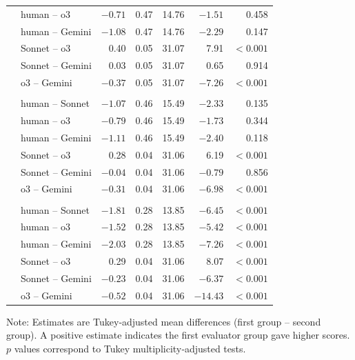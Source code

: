 \documentclass{wiley-article}
\begin{document}
\begin{table}[H]
\begin{threeparttable}
\begin{tabular}{l p{} r r r r r}
        & human – o3       & $-0.71$ & 0.47 & 14.76 & $-1.51$ & 0.458 \\
        & human – Gemini   & $-1.08$ & 0.47 & 14.76 & $-2.29$ & 0.147 \\
        & Sonnet – o3      &  0.40   & 0.05 & 31.07 &  7.91   & $<\!0.001$ \\
        & Sonnet – Gemini  &  0.03   & 0.05 & 31.07 &  0.65   & 0.914 \\
        & o3 – Gemini      & $-0.37$ & 0.05 & 31.07 & $-7.26$ & $<\!0.001$ \\
      \addlinespace
      \multicolumn{7}{l}{\textbf{EMP}}\\
        & human – Sonnet   & $-1.07$ & 0.46 & 15.49 & $-2.33$ & 0.135 \\
        & human – o3       & $-0.79$ & 0.46 & 15.49 & $-1.73$ & 0.344 \\
        & human – Gemini   & $-1.11$ & 0.46 & 15.49 & $-2.40$ & 0.118 \\
        & Sonnet – o3      &  0.28   & 0.04 & 31.06 &  6.19   & $<\!0.001$ \\
        & Sonnet – Gemini  & $-0.04$ & 0.04 & 31.06 & $-0.79$ & 0.856 \\
        & o3 – Gemini      & $-0.31$ & 0.04 & 31.06 & $-6.98$ & $<\!0.001$ \\
      \addlinespace
      \multicolumn{7}{l}{\textbf{OVR}}\\
        & human – Sonnet   & $-1.81$ & 0.28 & 13.85 & $-6.45$ & $<\!0.001$ \\
        & human – o3       & $-1.52$ & 0.28 & 13.85 & $-5.42$ & $<\!0.001$ \\
        & human – Gemini   & $-2.03$ & 0.28 & 13.85 & $-7.26$ & $<\!0.001$ \\
        & Sonnet – o3      &  0.29   & 0.04 & 31.06 &  8.07   & $<\!0.001$ \\
        & Sonnet – Gemini  & $-0.23$ & 0.04 & 31.06 & $-6.37$ & $<\!0.001$ \\
        & o3 – Gemini      & $-0.52$ & 0.04 & 31.06 & $-14.43$& $<\!0.001$ \\
      \bottomrule
    \end{tabular}
    \begin{tablenotes}
      \scriptsize
      \item Note: Estimates are Tukey‐adjusted mean differences (first group – second group). A positive estimate indicates the first evaluator group gave higher scores. $p$ values correspond to Tukey multiplicity‐adjusted tests.
    \end{tablenotes}
  \end{threeparttable}
\end{table}
\end{document}
